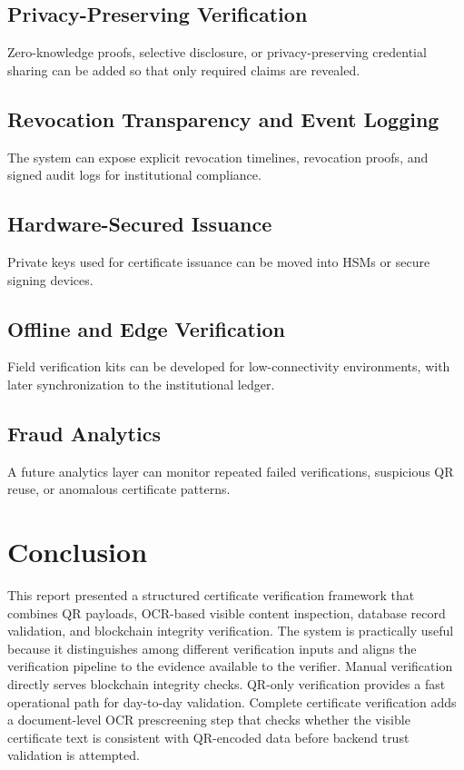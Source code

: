 \documentclass[12pt,a4paper]{article}
\begin{document}
\subsection{Privacy-Preserving Verification}
Zero-knowledge proofs, selective disclosure, or privacy-preserving credential sharing can be added so that only required claims are revealed.

\subsection{Revocation Transparency and Event Logging}
The system can expose explicit revocation timelines, revocation proofs, and signed audit logs for institutional compliance.

\subsection{Hardware-Secured Issuance}
Private keys used for certificate issuance can be moved into HSMs or secure signing devices.

\subsection{Offline and Edge Verification}
Field verification kits can be developed for low-connectivity environments, with later synchronization to the institutional ledger.

\subsection{Fraud Analytics}
A future analytics layer can monitor repeated failed verifications, suspicious QR reuse, or anomalous certificate patterns.

\section{Conclusion}
This report presented a structured certificate verification framework that combines QR payloads, OCR-based visible content inspection, database record validation, and blockchain integrity verification. The system is practically useful because it distinguishes among different verification inputs and aligns the verification pipeline to the evidence available to the verifier. Manual verification directly serves blockchain integrity checks. QR-only verification provides a fast operational path for day-to-day validation. Complete certificate verification adds a document-level OCR prescreening step that checks whether the visible certificate text is consistent with QR-encoded data before backend trust validation is attempted.
\end{document}
